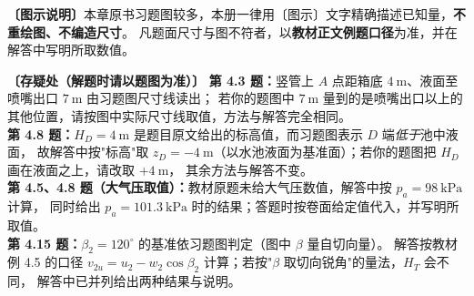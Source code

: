 \begin{tishi}
\textbf{〔图示说明〕}本章原书习题图较多，本册一律用〔图示〕文字精确描述已知量，\textbf{不重绘图、不编造尺寸}。
凡题面尺寸与图不符者，以\textbf{教材正文例题口径}为准，并在解答中写明所取数值。

\textbf{〔存疑处（解题时请以题图为准）〕}
\textbf{第 4.3 题：}竖管上 $A$ 点距箱底 $4\ \mathrm{m}$、液面至喷嘴出口 $7\ \mathrm{m}$ 由习题图尺寸线读出；
若你的题图中 $7\ \mathrm{m}$ 量到的是喷嘴出口以上的其他位置，请按图中实际尺寸线取值，方法与解答完全相同。\\
\textbf{第 4.8 题：}$H_D=4\ \mathrm{m}$ 是题目原文给出的标高值，而习题图表示 $D$ 端\emph{低于}池中液面，
故解答中按"标高"取 $z_D=-4\ \mathrm{m}$（以水池液面为基准面）；若你的题图把 $H_D$ 画在液面之上，请改取 $+4\ \mathrm{m}$，
其余方法与解答不变。\\
\textbf{第 4.5、4.8 题（大气压取值）：}教材原题未给大气压数值，解答中按 $p_a=98\ \mathrm{kPa}$ 计算，
同时给出 $p_a=101.3\ \mathrm{kPa}$ 时的结果；答题时按卷面给定值代入，并写明所取值。\\
\textbf{第 4.15 题：}$\beta_2=120^{\circ}$ 的基准依习题图判定（图中 $\beta$ 量自切向量）。
解答按教材例 4.5 的口径 $v_{2u}=u_2-w_2\cos\beta_2$ 计算；若按"$\beta$ 取切向锐角"的量法，$H_T$ 会不同，
解答中已并列给出两种结果与说明。
\end{tishi}
